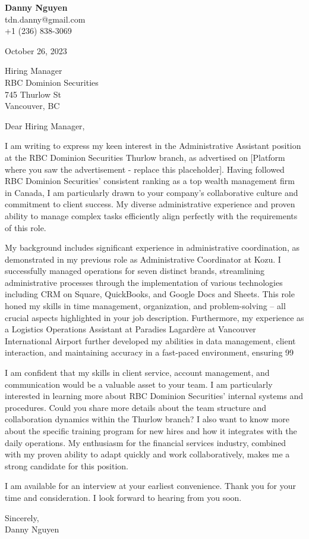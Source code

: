 \documentclass[letterpaper,11pt]{article}
\begin{document}
\textbf{Danny Nguyen} \\
tdn.danny@gmail.com \\
+1 (236) 838-3069 \\
\vspace{20pt}

October 26, 2023 \\
\vspace{20pt}

Hiring Manager \\
RBC Dominion Securities \\
745 Thurlow St \\
Vancouver, BC \\
\vspace{20pt}

Dear Hiring Manager, \\
\vspace{10pt}

I am writing to express my keen interest in the Administrative Assistant position at the RBC Dominion Securities Thurlow branch, as advertised on [Platform where you saw the advertisement -  replace this placeholder].  Having followed RBC Dominion Securities' consistent ranking as a top wealth management firm in Canada, I am particularly drawn to your company's collaborative culture and commitment to client success. My diverse administrative experience and proven ability to manage complex tasks efficiently align perfectly with the requirements of this role.

My background includes significant experience in administrative coordination, as demonstrated in my previous role as Administrative Coordinator at Kozu.  I successfully managed operations for seven distinct brands, streamlining administrative processes through the implementation of various technologies including CRM on Square, QuickBooks, and Google Docs and Sheets. This role honed my skills in time management, organization, and problem-solving – all crucial aspects highlighted in your job description.  Furthermore, my experience as a Logistics Operations Assistant at Paradies Lagardère at Vancouver International Airport further developed my abilities in data management, client interaction, and maintaining accuracy in a fast-paced environment, ensuring 99%

I am confident that my skills in client service,  account management, and communication would be a valuable asset to your team.  I am particularly interested in learning more about RBC Dominion Securities' internal systems and procedures.  Could you share more details about the team structure and collaboration dynamics within the Thurlow branch?  I also want to know more about the specific training program for new hires and how it integrates with the daily operations. My enthusiasm for the financial services industry, combined with my proven ability to adapt quickly and work collaboratively, makes me a strong candidate for this position.

I am available for an interview at your earliest convenience. Thank you for your time and consideration. I look forward to hearing from you soon.

\vspace{20pt}

Sincerely, \\
\vspace{40pt}
Danny Nguyen
\end{document}
